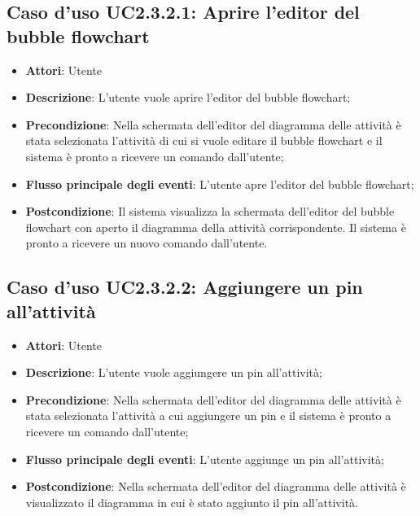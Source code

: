 \documentclass[../AnalisiDeiRequisiti.tex]{subfiles}
\begin{document}
				\subsection{Caso d'uso UC2.3.2.1: Aprire l'editor del bubble flowchart}
				\begin{itemize}
					\item \textbf{Attori}: Utente
					\item \textbf{Descrizione}: L'utente vuole aprire l'editor del bubble flowchart; 
					\item \textbf{Precondizione}: Nella schermata dell'editor del diagramma delle attività è stata selezionata l'attività di cui si vuole editare il bubble flowchart e il sistema è pronto a ricevere un comando dall'utente;
					\item \textbf{Flusso principale degli eventi}: L'utente apre l'editor del bubble flowchart;
					\item \textbf{Postcondizione}: Il sistema visualizza la schermata dell'editor del bubble flowchart con aperto il diagramma della attività corrispondente. Il sistema è pronto a ricevere un nuovo comando dall'utente.
				\end{itemize}
				\subsection{Caso d'uso UC2.3.2.2: Aggiungere un pin all'attività}
				\begin{itemize}
					\item \textbf{Attori}: Utente
					\item \textbf{Descrizione}: L'utente vuole aggiungere un pin all'attività;
					\item \textbf{Precondizione}: Nella schermata dell'editor del diagramma delle attività è stata selezionata l'attività a cui aggiungere un pin e il sistema è pronto a ricevere un comando dall'utente;
					\item \textbf{Flusso principale degli eventi}: L'utente aggiunge un pin all'attività;
					\item \textbf{Postcondizione}: Nella schermata dell'editor del diagramma delle attività è visualizzato il diagramma in cui è stato aggiunto il pin all'attività.
				\end{itemize}
\end{document}
